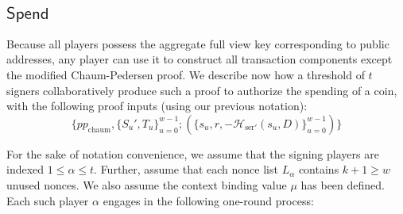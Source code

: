 \documentclass{llncs}
\newcommand{\hash}{\mathcal{H}}
\newcommand{\func}[1]{\mathsf{#1}}
\begin{document}
\subsection{\texorpdfstring{$\func{Spend}$}{Spend}}

Because all players possess the aggregate full view key corresponding to public addresses, any player can use it to construct all transaction components except the modified Chaum-Pedersen proof.
We describe now how a threshold of $t$ signers collaboratively produce such a proof to authorize the spending of a coin, with the following proof inputs (using our previous notation):
$$\{pp_{\text{chaum}}, \{S_u', T_u\}_{u=0}^{w-1}; (\{s_u, r, -\hash_{\text{ser}'}(s_u, D)\}_{u=0}^{w-1})\}$$

For the sake of notation convenience, we assume that the signing players are indexed $1 \leq \alpha \leq t$.
Further, assume that each nonce list $L_\alpha$ contains $k + 1 \geq w$ unused nonces.
We also assume the context binding value $\mu$ has been defined.
Each such player $\alpha$ engages in the following one-round process:
\end{document}
